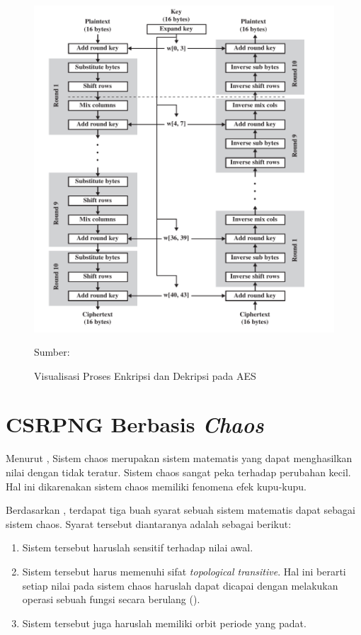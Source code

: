 \begin{figure}[!h]
  \centering
  \includegraphics[width=\textwidth]{chapters/res/chapter-2/img/crypto.aes.png}
  \caption{Visualisasi Proses Enkripsi dan Dekripsi pada AES} \label{fig:crypto.aes}
  Sumber: \textcite{staling2011}
\end{figure}

\section{CSRPNG Berbasis \emph{Chaos}}
Menurut \textcite{munir2019}, Sistem chaos merupakan sistem matematis yang dapat menghasilkan nilai dengan tidak teratur. Sistem chaos sangat peka terhadap perubahan kecil. Hal ini dikarenakan sistem chaos memiliki fenomena efek kupu-kupu.

Berdasarkan \textcite{boris2003}, terdapat tiga buah syarat sebuah sistem matematis dapat sebagai sistem chaos. Syarat tersebut diantaranya adalah sebagai berikut:
\begin{enumerate}
  \item Sistem tersebut haruslah sensitif terhadap nilai awal.
  \item Sistem tersebut harus memenuhi sifat \emph{topological transitive}. Hal ini berarti setiap nilai pada sistem chaos haruslah dapat dicapai dengan melakukan operasi sebuah fungsi secara berulang (\textcite{boris2003}).
  \item Sistem tersebut juga haruslah memiliki orbit periode yang padat.
\end{enumerate}

